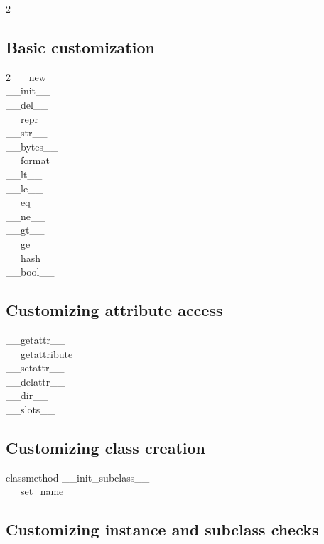 \documentclass [8pt] {extarticle}
\begin{document}
    \begin {multicols} {2}

    \subsection {Basic customization}

    \begin {multicols} {2}
    \_\_new\_\_ \\
    \_\_init\_\_ \\
    \_\_del\_\_ \\
    \_\_repr\_\_ \\
    \_\_str\_\_ \\
    \_\_bytes\_\_ \\
    \_\_format\_\_ \\
    \_\_lt\_\_ \\
    \_\_le\_\_ \\
    \_\_eq\_\_ \\
    \_\_ne\_\_ \\
    \_\_gt\_\_ \\
    \_\_ge\_\_ \\
    \_\_hash\_\_ \\
    \_\_bool\_\_ \\
    \end {multicols}

    \subsection {Customizing attribute access}

    \_\_getattr\_\_ \\
    \_\_getattribute\_\_ \\
    \_\_setattr\_\_ \\
    \_\_delattr\_\_ \\
    \_\_dir\_\_ \\
    \_\_slots\_\_ \\

    \columnbreak

    \subsection {Customizing class creation}

    classmethod \_\_init\_subclass\_\_ \\
    \_\_set\_name\_\_ \\

    \subsection {Customizing instance and subclass checks}


\end{multicols}
\end{document}
